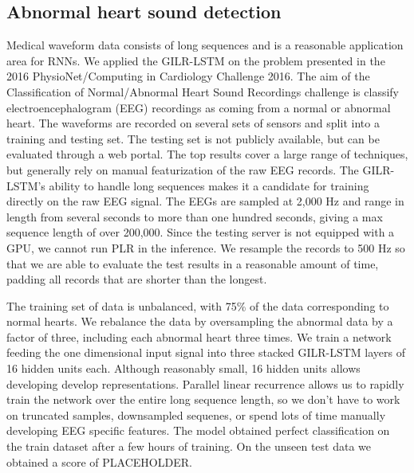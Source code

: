 \documentclass{article}
\begin{document}
\subsection{Abnormal heart sound detection}
Medical waveform data consists of long sequences and is a reasonable application area for RNNs.
We applied the GILR-LSTM
on the problem presented in the 2016 PhysioNet/Computing in
Cardiology Challenge 2016.  The aim of the Classification of Normal/Abnormal
Heart Sound Recordings challenge is classify electroencephalogram (EEG) recordings
as coming from a normal or abnormal heart.
The waveforms are recorded on several sets of sensors
and split into a training and testing set. The testing set is not
publicly available, but can be evaluated through a web portal. The top results
cover a large range of techniques, but generally rely on manual featurization of the
raw EEG records. The GILR-LSTM's ability to handle long sequences makes it a
candidate for training directly on the raw EEG signal.
The EEGs are sampled at 2,000 Hz
and range in length from several seconds to more than one hundred seconds,
giving a max sequence length of over 200,000. Since the testing server is not
equipped with a GPU, we cannot run PLR in the inference. We resample the
records to 500 Hz so that we are able to evaluate the test results in a
reasonable amount of time, padding all records that are shorter than the longest.

The training set of data is unbalanced, with 75\% of the data corresponding to
normal hearts. We rebalance the data by oversampling the abnormal data by a factor
of three, including each abnormal heart three times. We train a network feeding
the one dimensional input signal into three stacked GILR-LSTM layers of 16 hidden units each.
Although reasonably small, 16 hidden units allows developing
develop representations. Parallel linear recurrence allows us to rapidly train the network
over the entire long sequence length, so we don't have to work on truncated samples,
downsampled sequenes, or
spend lots of time manually developing EEG specific features.
The model obtained perfect classification on the train dataset after
a few hours  of training.
On the unseen test data we obtained a score of PLACEHOLDER.

\end{document}

